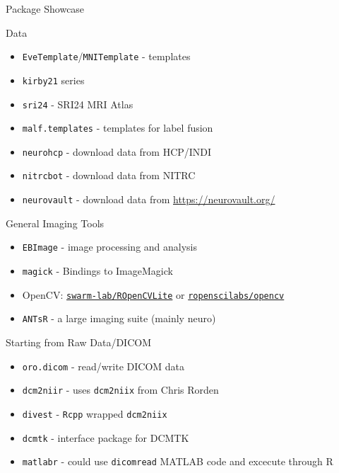\documentclass[ignorenonframetext,]{beamer}
\providecommand{\tightlist}{%
  \setlength{\itemsep}{0pt}\setlength{\parskip}{0pt}}
\begin{document}
\begin{frame}[fragile]{Package Showcase}
\protect\hypertarget{package-showcase}{}

\begin{block}{Data}

\begin{itemize}
\tightlist
\item
  \texttt{EveTemplate}/\texttt{MNITemplate} - templates
\item
  \texttt{kirby21} series
\item
  \texttt{sri24} - SRI24 MRI Atlas
\item
  \texttt{malf.templates} - templates for label fusion
\item
  \texttt{neurohcp} - download data from HCP/INDI
\item
  \texttt{nitrcbot} - download data from NITRC
\item
  \texttt{neurovault} - download data from \url{https://neurovault.org/}
\end{itemize}

\end{block}

\begin{block}{General Imaging Tools}

\begin{itemize}
\tightlist
\item
  \texttt{EBImage} - image processing and analysis
\item
  \texttt{magick} - Bindings to ImageMagick
\item
  OpenCV:
  \href{https://github.com/swarm-lab/ROpenCVLite}{\texttt{swarm-lab/ROpenCVLite}}
  or
  \href{https://github.com/ropenscilabs/opencv}{\texttt{ropenscilabs/opencv}}
\item
  \texttt{ANTsR} - a large imaging suite (mainly neuro)
\end{itemize}

\end{block}

\begin{block}{Starting from Raw Data/DICOM}

\begin{itemize}
\tightlist
\item
  \texttt{oro.dicom} - read/write DICOM data
\item
  \texttt{dcm2niir} - uses \texttt{dcm2niix} from Chris Rorden
\item
  \texttt{divest} - \texttt{Rcpp} wrapped \texttt{dcm2niix}
\item
  \texttt{dcmtk} - interface package for DCMTK
\item
  \texttt{matlabr} - could use \texttt{dicomread} MATLAB code and
  excecute through R
\end{itemize}


\end{block}
\end{frame}
\end{document}
